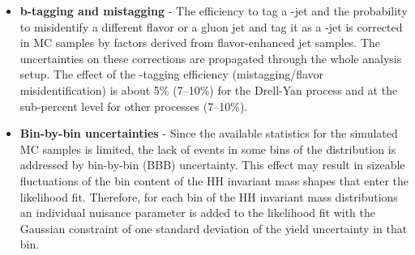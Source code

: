 \begin{itemize}
\item{\bfseries b-tagging and mistagging} - The efficiency to tag a \Pqb-jet and the
  probability to misidentify a different flavor or a gluon jet and tag it as a
  \Pqb-jet is corrected in MC samples by factors derived from
  flavor-enhanced jet samples. The uncertainties on these corrections
  are propagated through the whole analysis setup. The effect of the
  \Pqb-tagging efficiency (mistagging/flavor misidentification) is about 5\% (7--10\%) for the Drell-Yan process and at the sub-percent level for other processes (7--10\%).

\item{\bfseries Bin-by-bin uncertainties} - Since the available statistics for the simulated MC samples is limited, the lack of events in some bins of the \mTHH distribution is addressed by bin-by-bin (BBB) uncertainty. This effect may result in sizeable fluctuations of the bin content of the HH invariant mass shapes that enter the
  likelihood fit. Therefore, for each bin of the HH invariant mass distributions
  an individual nuisance parameter is added to the likelihood fit with the Gaussian constraint of one standard deviation of
  the yield uncertainty in that bin.
  
\end{itemize}







